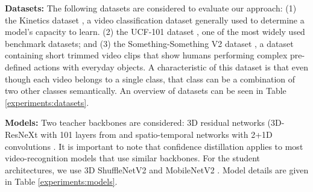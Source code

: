 \documentclass[a4paper,conference]{IEEEtran}
\begin{document}
{\bf Datasets:} The following datasets are considered to evaluate our approach: (1) the Kinetics dataset \cite{kay2017kinetics, carreira2018short, carreira2019short}, a video classification dataset generally used to determine a model's capacity to learn. (2) the UCF-101 dataset \cite{soomro2012ucf101}, one of the most widely used benchmark datasets; and (3) the Something-Something V2 dataset \cite{goyal2017something}, a dataset containing short trimmed video clips that show humans performing complex pre-defined actions with everyday objects. A characteristic of this dataset is that even though each video belongs to a single class, that class can be a combination of two other classes semantically. An overview of datasets can be seen in Table \ref{experiments:datasets}.

\begin{table}[h]
\begin{center}
{}
\end{center}
\caption{Overview of datasets used in our experiments.
\vspace{-0.1in}}
\label{experiments:datasets}
\vspace{-0.05in}
\end{table}


{\bf Models:} Two teacher backbones are considered: 3D residual networks (3D-ResNeXt with 101 layers from \cite{Hara_2018_CVPR} and spatio-temporal networks with 2+1D convolutions \cite{tran2018closer}. It is important to note that confidence distillation applies to most video-recognition models that use similar backbones. For the student architectures, we use 3D ShuffleNetV2 and MobileNetV2 \cite{kopuklu2019resource}. Model details are given in Table \ref{experiments:models}.
\end{document}
